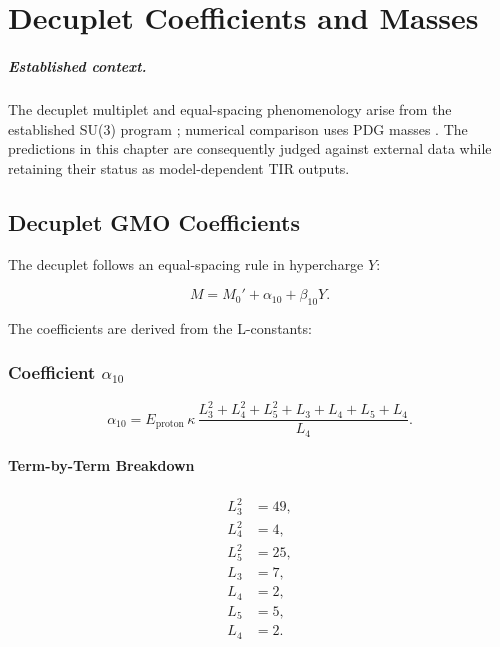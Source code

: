 \chapter{Decuplet Coefficients and Masses}
\label{ch:decuplet_predictions}


\paragraph{Established context.}
The decuplet multiplet and equal-spacing phenomenology arise from the established
SU(3) program \cite{GellMann1962,okubo1962}; numerical comparison uses PDG masses
\cite{PDG2024}.  The predictions in this chapter are consequently judged against
external data while retaining their status as model-dependent TIR outputs.

\section{Decuplet GMO Coefficients}

The decuplet follows an equal-spacing rule in hypercharge \(Y\):

\begin{equation}
M = M_0' + \alpha_{10} + \beta_{10} Y.
\label{eq:decuplet_formula}
\end{equation}

The coefficients are derived from the L-constants:

\subsection{Coefficient \(\alpha_{10}\)}

\begin{equation}
\alpha_{10} = E_{\text{proton}}\,\kappa\,
\frac{L_3^2 + L_4^2 + L_5^2 + L_3 + L_4 + L_5 + L_4}{L_4}.
\label{eq:alpha10}
\end{equation}

\subsubsection{Term-by-Term Breakdown}

\[
\begin{aligned}
L_3^2 &= 49,\\
L_4^2 &= 4,\\
L_5^2 &= 25,\\
L_3   &= 7,\\
L_4   &= 2,\\
L_5   &= 5,\\
L_4   &= 2.
\end{aligned}
\]


